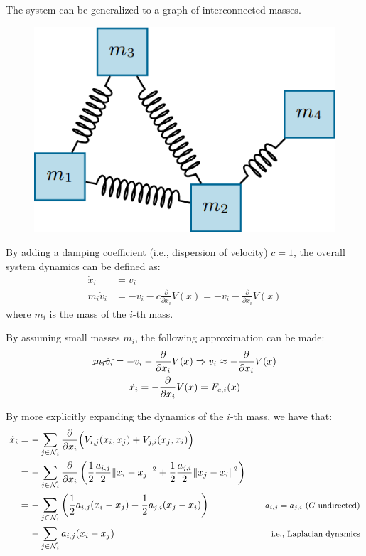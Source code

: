 \begin{description}
        \begin{remark}
            The system can be generalized to a graph of interconnected masses.

            \begin{figure}[H]
                \centering
                \includegraphics[width=0.3\linewidth]{./img/mass_spring_system3.png}
            \end{figure}
        \end{remark}
        
        By adding a damping coefficient (i.e., dispersion of velocity) $c=1$, the overall system dynamics can be defined as:
        \[
            \begin{split}
                \dot{x}_i &= v_i \\
                m_i \dot{v}_i &= - v_i - c\frac{\partial}{\partial x_i} V(x) = - v_i - \frac{\partial}{\partial x_i} V(x)
            \end{split}
        \]
        where $m_i$ is the mass of the $i$-th mass.

        By assuming small masses $m_i$, the following approximation can be made:
        \[
            \begin{gathered}
                \cancel{m_i \dot{v}_i} = - v_i - \frac{\partial}{\partial x_i} V(x) \Rightarrow v_i \approx -\frac{\partial}{\partial x_i} V(x) \\
                \dot{x_i} = -\frac{\partial}{\partial x_i} V(x) = F_{e,i}(x)
            \end{gathered}
        \]

        By more explicitly expanding the dynamics of the $i$-th mass, we have that:
        \[
            \begin{aligned}
                \dot{x}_i
                &= - \sum_{j \in \mathcal{N}_i} \frac{\partial}{\partial x_i} \Big( V_{i,j}(x_i, x_j) + V_{j,i}(x_j, x_i) \Big) \\
                &= - \sum_{j \in \mathcal{N}_i} \frac{\partial}{\partial x_i} \left( \frac{1}{2} \frac{a_{i,j}}{2} \Vert x_i - x_j \Vert^2 + \frac{1}{2} \frac{a_{j,i}}{2} \Vert x_j - x_i \Vert^2 \right) \\
                &= - \sum_{j \in \mathcal{N}_i} \left( \frac{1}{2} a_{i,j} (x_i - x_j) - \frac{1}{2} a_{j,i} (x_j - x_i) \right) &&& \text{\footnotesize $a_{i,j}=a_{j,i}$ ($G$ undirected)} \\
                &= - \sum_{j \in \mathcal{N}_i} a_{i,j} (x_i - x_j) &&& \text{\footnotesize i.e., Laplacian dynamics}
            \end{aligned}
        \]
        

\end{description}
